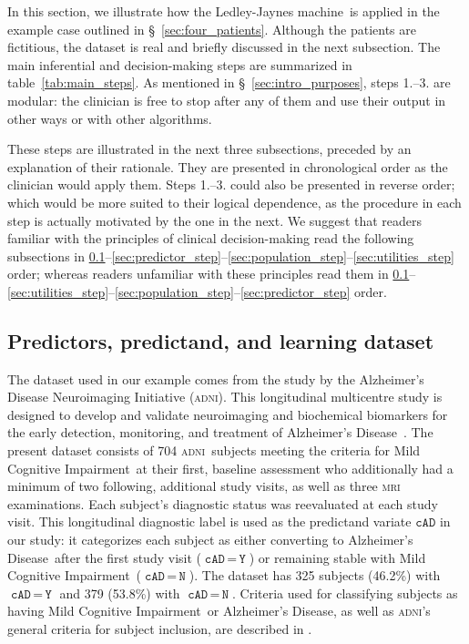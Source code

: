 \documentclass[utf8]{FrontiersinHarvard} %
\newcommand*{\mo}[1][=]{\mathord{\,#1\,}}
\newcommand*{\sect}{\S}%
\renewcommand*{\|}[1][]{\nonscript\:#1\vert\nonscript\:\mathopen{}}
\newcommand*{\cad}{\texttt{cAD}}
\newcommand*{\yes}{\texttt{Y}}
\newcommand*{\no}{\texttt{N}}
\newcommand*{\ad}{Alzheimer's Disease}
\newcommand*{\mci}{Mild Cognitive Impairment}
\newcommand*{\ljm}{Ledley-Jaynes machine}
\newcommand*{\adni}{\textsc{adni}}
\begin{document}
In this section, we illustrate how the \ljm\ is applied in the example case outlined in \sect~\ref{sec:four_patients}. Although the patients are fictitious, the dataset is real and briefly discussed in the next subsection. The main inferential and decision-making steps are summarized in table~\ref{tab:main_steps}. As mentioned in \sect~\ref{sec:intro_purposes}, steps 1.--3. are modular: the clinician is free to stop after any of them and use their output in other ways or with other algorithms.


These steps are illustrated in the next three subsections, preceded by an explanation of their rationale. They are presented in chronological order as the clinician would apply them. %
Steps 1.--3. could also be presented in reverse order; which would be more suited to their logical dependence, as the procedure in each step is actually motivated by the one in the next. We suggest that readers familiar with the principles of clinical decision-making read the following subsections in \ref{sec:dataset}--\ref{sec:predictor_step}--\ref{sec:population_step}--\ref{sec:utilities_step} order; whereas readers unfamiliar with these principles read them in \ref{sec:dataset}--\ref{sec:utilities_step}--\ref{sec:population_step}--\ref{sec:predictor_step} order.


\setcounter{subsection}{-1}
\subsection{Predictors, predictand, and learning dataset}
\label{sec:dataset}

The dataset used in our example comes from the study by the Alzheimer's Disease Neuroimaging Initiative (\adni). This longitudinal multicentre study is designed to develop and validate neuroimaging and biochemical biomarkers for the early detection, monitoring, and treatment of \ad\ \citep{petersenetal2010}. The present dataset consists of 704 \adni\ subjects meeting the criteria for \mci\ at their first, baseline assessment who additionally had a minimum of two following, additional study visits, as well as three \textsc{mri} examinations. Each subject's diagnostic status was reevaluated at each study visit. This longitudinal diagnostic label is used as the predictand variate $\cad$ in our study: it categorizes each subject as either converting to \ad\ after the first study visit ($\cad\mo\yes$) or remaining stable with \mci\ ($\cad\mo\no$). The dataset has 325 subjects (46.2\%) with $\cad\mo\yes$ and 379 (53.8\%) with $\cad\mo\no$. Criteria used for classifying subjects as having \mci\ or \ad, as well as \adni's general criteria for subject inclusion, are described in \citet{mckhannetal1984,petersenetal2010}.
\end{document}
